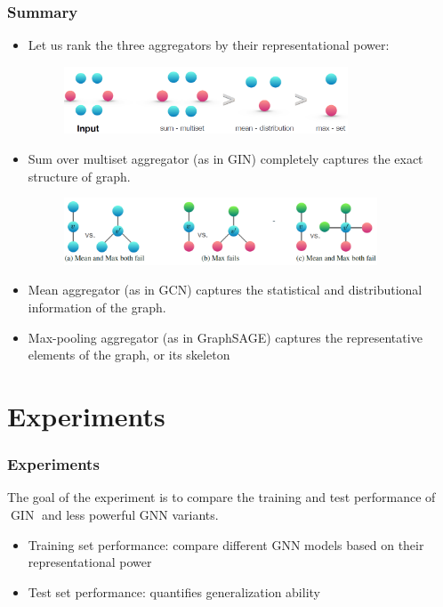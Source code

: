 \documentclass{beamer}
\DeclareMathOperator{\gin}{GIN}
\begin{document}
\begin{frame}
\frametitle{Summary}

\begin{itemize}
	\item Let us rank the three aggregators by their representational power: \pause

\begin{figure}[hbt]
  \includegraphics[height=2cm]{fig3.png}
\end{figure}

	\item Sum over multiset aggregator (as in GIN) completely captures the exact structure of graph. \pause
	
\begin{figure}[hbt]
  \includegraphics[height=2cm]{fig4.png}
\end{figure}
	
	\item Mean aggregator (as in GCN) captures the statistical and distributional information of the graph. \pause
	
	\item Max-pooling aggregator (as in GraphSAGE) captures the representative elements of the graph, or its skeleton
\end{itemize}


\end{frame}


\section{Experiments}

\begin{frame}
\frametitle{Experiments}

The goal of the experiment is to compare the training and test performance of $\gin$ and less powerful GNN variants. \pause

\begin{itemize}
	\item Training set performance: compare different GNN models based on their representational power

	\item Test set performance: quantifies generalization ability
\end{itemize}

\end{frame}
\end{document}
